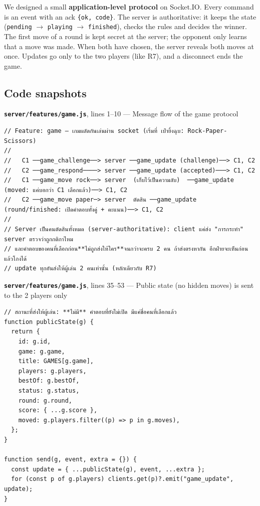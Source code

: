 \documentclass[11pt,a4paper]{article}
\newcommand{\code}[1]{\texttt{#1}}
\newcommand{\snap}[3]{\par\medskip\textbf{\code{#1}}, lines #2 --- #3}
\begin{document}
We designed a small \textbf{application-level protocol} on Socket.IO. Every command is an
event with an ack \code{\{ok, code\}}. The server is authoritative: it keeps the state
(\code{pending} $\rightarrow$ \code{playing} $\rightarrow$ \code{finished}), checks the rules and decides the
winner. The first move of a round is kept secret at the server; the opponent only learns that a move was
made. When both have chosen, the server reveals both moves at once. Updates go only to the two players
(like R7), and a disconnect ends the game.

\subsection*{Code snapshots}
\snap{server/features/game.js}{1--10}{Message flow of the game protocol}
\begin{Verbatim}[firstnumber=1]
// Feature: game — เกมผลัดกันเล่นผ่าน socket (เริ่มที่ เป่ายิ้งฉุบ: Rock-Paper-Scissors)
//
//   C1 ──game_challenge──> server ──game_update (challenge)──> C1, C2
//   C2 ──game_respond────> server ──game_update (accepted)───> C1, C2
//   C1 ──game_move rock──> server  (เก็บไว้เป็นความลับ)  ──game_update (moved: แค่บอกว่า C1 เลือกแล้ว)──> C1, C2
//   C2 ──game_move paper─> server  ตัดสิน ──game_update (round/finished: เปิดคำตอบทั้งคู่ + คะแนน)──> C1, C2
//
// Server เป็นคนตัดสินทั้งหมด (server-authoritative): client แค่ส่ง "การกระทำ" server ตรวจว่าถูกกติกาไหม
// และคำตอบของคนที่เลือกก่อน**ไม่ถูกส่งให้ใคร**จนกว่าจะครบ 2 คน ถ้าส่งตรงหากัน อีกฝ่ายจะเห็นก่อนแล้วโกงได้
// update ทุกอันส่งให้ผู้เล่น 2 คนเท่านั้น (หลักเดียวกับ R7)
\end{Verbatim}

\snap{server/features/game.js}{35--53}{Public state (no hidden moves) is sent to the 2 players only}
\begin{Verbatim}[firstnumber=35]
// สถานะที่ส่งให้ผู้เล่น: **ไม่มี** คำตอบที่ยังไม่เปิด มีแค่ชื่อคนที่เลือกแล้ว
function publicState(g) {
  return {
    id: g.id,
    game: g.game,
    title: GAMES[g.game],
    players: g.players,
    bestOf: g.bestOf,
    status: g.status,
    round: g.round,
    score: { ...g.score },
    moved: g.players.filter((p) => p in g.moves),
  };
}

function send(g, event, extra = {}) {
  const update = { ...publicState(g), event, ...extra };
  for (const p of g.players) clients.get(p)?.emit("game_update", update);
}
\end{Verbatim}
\end{document}
